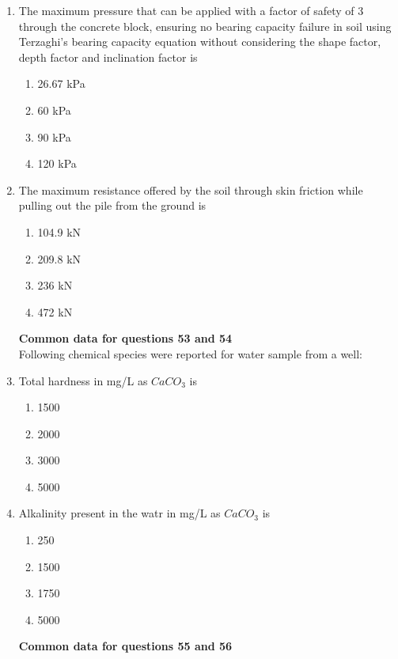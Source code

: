 \documentclass[journal]{IEEEtran}
\begin{document}
\begin{enumerate}
 
 \item The maximum pressure that can be applied with a factor of safety of 3 through the concrete block, ensuring no bearing capacity failure in soil using Terzaghi's bearing capacity equation without considering the shape factor, depth factor and inclination factor is 
 
 \begin{enumerate}
     \item 26.67 kPa
     \item 60 kPa
     \item 90 kPa
     \item 120 kPa

 \end{enumerate}
 \item The maximum resistance offered by the soil through skin friction while pulling out the pile from the ground is
 \begin{enumerate}
     \item 104.9 kN
      \item 209.8 kN
     \item 236 kN
     \item 472 kN \\
\end{enumerate}
 \textbf{Common data for questions 53 and 54} \\
 Following chemical species were reported for water sample from a well:
 \begin{table}[H]
  \centering
  
  \end{table}
  \item Total hardness in mg/L as $CaCO_{3}$  is
  \begin{enumerate}
      \item 1500
      \item 2000
      \item 3000
      \item 5000
  \end{enumerate}
  \item Alkalinity present in the watr in mg/L as $CaCO_{3}$ is 
  \begin{enumerate}
      \item 250
      \item 1500
      \item 1750
      \item 5000 \\
  \end{enumerate}
  \textbf{Common data for questions 55 and 56} \\

\end{enumerate}
\end{document}
